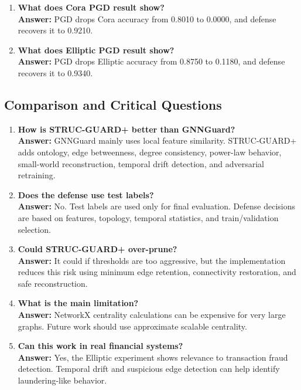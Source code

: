 \documentclass[12pt,a4paper]{article}
\begin{document}
\begin{enumerate}[label=\textbf{Q\arabic*.},resume]
    \item \textbf{What does Cora PGD result show?}\\
    \textbf{Answer:} PGD drops Cora accuracy from 0.8010 to 0.0000, and defense recovers it to 0.9210.

    \item \textbf{What does Elliptic PGD result show?}\\
    \textbf{Answer:} PGD drops Elliptic accuracy from 0.8750 to 0.1180, and defense recovers it to 0.9340.
\end{enumerate}

\subsection{Comparison and Critical Questions}
\begin{enumerate}[label=\textbf{Q\arabic*.},resume]
    \item \textbf{How is STRUC-GUARD+ better than GNNGuard?}\\
    \textbf{Answer:} GNNGuard mainly uses local feature similarity. STRUC-GUARD+ adds ontology, edge betweenness, degree consistency, power-law behavior, small-world reconstruction, temporal drift detection, and adversarial retraining.

    \item \textbf{Does the defense use test labels?}\\
    \textbf{Answer:} No. Test labels are used only for final evaluation. Defense decisions are based on features, topology, temporal statistics, and train/validation selection.

    \item \textbf{Could STRUC-GUARD+ over-prune?}\\
    \textbf{Answer:} It could if thresholds are too aggressive, but the implementation reduces this risk using minimum edge retention, connectivity restoration, and safe reconstruction.

    \item \textbf{What is the main limitation?}\\
    \textbf{Answer:} NetworkX centrality calculations can be expensive for very large graphs. Future work should use approximate scalable centrality.

    \item \textbf{Can this work in real financial systems?}\\
    \textbf{Answer:} Yes, the Elliptic experiment shows relevance to transaction fraud detection. Temporal drift and suspicious edge detection can help identify laundering-like behavior.


\end{enumerate}
\end{document}
